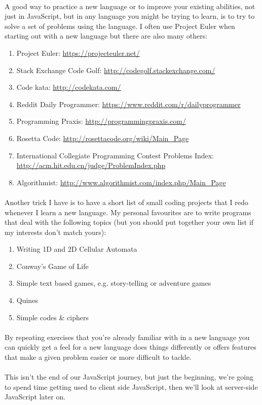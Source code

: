 \documentclass[10pt, a4paper, twosize]{article}
\begin{document}
\paragraph{} A good way to practice a new language or to improve your existing abilities, not just in JavaScript, but in any language you might be trying to learn, is to try to solve a set of problems using the language. I often use Project Euler when starting out with a new language but there are also many others:

\begin{enumerate}
\item Project Euler: \url{https://projecteuler.net/}
\item Stack Exchange Code Golf: \url{http://codegolf.stackexchange.com/}
\item Code kata: \url{http://codekata.com/}
\item Reddit Daily Programmer: \url{https://www.reddit.com/r/dailyprogrammer}
\item Programming Praxis: \url{http://programmingpraxis.com/}
\item Rosetta Code: \url{http://rosettacode.org/wiki/Main_Page}
\item International Collegiate Programming Contest Problems Index: \url{http://acm.hit.edu.cn/judge/ProblemIndex.php}
\item Algorithmist: \url{http://www.algorithmist.com/index.php/Main_Page}
\end{enumerate}

\paragraph{} Another trick I have is to have a short list of small coding projects that I redo whenever I learn a new language. My personal favourites are to write programs that deal with the following topics (but you should put together your own list if my interests don't match yours):
\begin{enumerate}
\item Writing 1D and 2D Cellular Automata
\item Conway's Game of Life
\item Simple text based games, e.g. story-telling or adventure games
\item Quines
\item Simple codes \& ciphers
\end{enumerate}

\paragraph{} By repeating exercises that you're already familiar with in a new language you can quickly get a feel for a new language does things differently or offers features that make a given problem easier or more difficult to tackle.

\paragraph{} This isn't the end of our JavaScript journey, but just the beginning, we're going to spend time getting used to client side JavaScript, then we'll look at server-side JavaScript later on.
\end{document}
